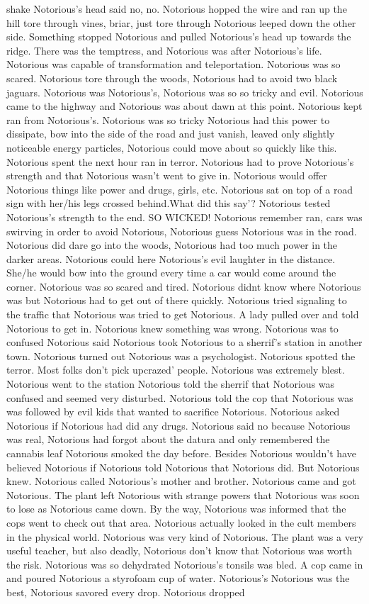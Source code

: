 \documentclass[12pt]{book}
\begin{document}
shake Notorious's head said no, no. Notorious hopped the wire and ran up the hill tore through vines, briar, just tore through Notorious leeped down the other side. Something stopped Notorious and pulled Notorious's head up towards the ridge. There was the temptress, and Notorious was after Notorious's life. Notorious was capable of transformation and teleportation. Notorious was so scared. Notorious tore through the woods, Notorious had to avoid two black jaguars. Notorious was Notorious's, Notorious was so so tricky and evil. Notorious came to the highway and Notorious was about dawn at this point. Notorious kept ran from Notorious's. Notorious was so tricky Notorious had this power to dissipate, bow into the side of the road and just vanish, leaved only slightly noticeable energy particles, Notorious could move about so quickly like this. Notorious spent the next hour ran in terror. Notorious had to prove Notorious's strength and that Notorious wasn't went to give in. Notorious would offer Notorious things like power and drugs, girls, etc. Notorious sat on top of a road sign with her/his legs crossed behind.What did this say'? Notorious tested Notorious's strength to the end. SO WICKED! Notorious remember ran, cars was swirving in order to avoid Notorious, Notorious guess Notorious was in the road. Notorious did dare go into the woods, Notorious had too much power in the darker areas. Notorious could here Notorious's evil laughter in the distance. She/he would bow into the ground every time a car would come around the corner. Notorious was so scared and tired. Notorious didnt know where Notorious was but Notorious had to get out of there quickly. Notorious tried signaling to the traffic that Notorious was tried to get Notorious. A lady pulled over and told Notorious to get in. Notorious knew something was wrong. Notorious was to confused Notorious said Notorious took Notorious to a sherrif's station in another town. Notorious turned out Notorious was a psychologist. Notorious spotted the terror. Most folks don't pick upcrazed' people. Notorious was extremely blest. Notorious went to the station Notorious told the sherrif that Notorious was confused and seemed very disturbed. Notorious told the cop that Notorious was was followed by evil kids that wanted to sacrifice Notorious. Notorious asked Notorious if Notorious had did any drugs. Notorious said no because Notorious was real, Notorious had forgot about the datura and only remembered the cannabis leaf Notorious smoked the day before. Besides Notorious wouldn't have believed Notorious if Notorious told Notorious that Notorious did. But Notorious knew. Notorious called Notorious's mother and brother. Notorious came and got Notorious. The plant left Notorious with strange powers that Notorious was soon to lose as Notorious came down. By the way, Notorious was informed that the cops went to check out that area. Notorious actually looked in the cult members in the physical world. Notorious was very kind of Notorious. The plant was a very useful teacher, but also deadly, Notorious don't know that Notorious was worth the risk. Notorious was so dehydrated Notorious's tonsils was bled. A cop came in and poured Notorious a styrofoam cup of water. Notorious's Notorious was the best, Notorious savored every drop. Notorious dropped 
\end{document}
